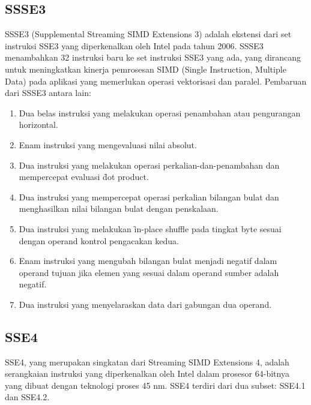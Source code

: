 \subsection{SSSE3}
SSSE3 (Supplemental Streaming SIMD Extensions 3) adalah ekstensi dari set instruksi SSE3 yang diperkenalkan oleh Intel pada tahun 2006. SSSE3 menambahkan 32 instruksi baru ke set instruksi SSE3 yang ada, yang dirancang untuk meningkatkan kinerja pemrosesan SIMD (Single Instruction, Multiple Data) pada aplikasi yang memerlukan operasi vektorisasi dan paralel. Pembaruan dari SSSE3 antara lain:

\begin{enumerate}
	\item Dua belas instruksi yang melakukan operasi penambahan atau pengurangan horizontal.
	\item Enam instruksi yang mengevaluasi nilai absolut.
	\item Dua instruksi yang melakukan operasi perkalian-dan-penambahan dan mempercepat evaluasi \f{dot product}.
	\item Dua instruksi yang mempercepat operasi perkalian bilangan bulat dan menghasilkan nilai bilangan bulat dengan penskalaan.
	\item Dua instruksi yang melakukan \f{in-place shuffle} pada tingkat byte sesuai dengan operand kontrol pengacakan kedua.
	\item Enam instruksi yang mengubah bilangan bulat menjadi negatif dalam operand tujuan jika elemen yang sesuai dalam operand sumber adalah negatif.
	\item Dua instruksi yang menyelaraskan data dari gabungan dua operand.
\end{enumerate}

\subsection{SSE4}
SSE4, yang merupakan singkatan dari Streaming SIMD Extensions 4, adalah serangkaian instruksi yang diperkenalkan oleh Intel dalam prosesor 64-bitnya yang dibuat dengan teknologi proses 45 nm. SSE4 terdiri dari dua subset: SSE4.1 dan SSE4.2\cite{sse4reference}.

